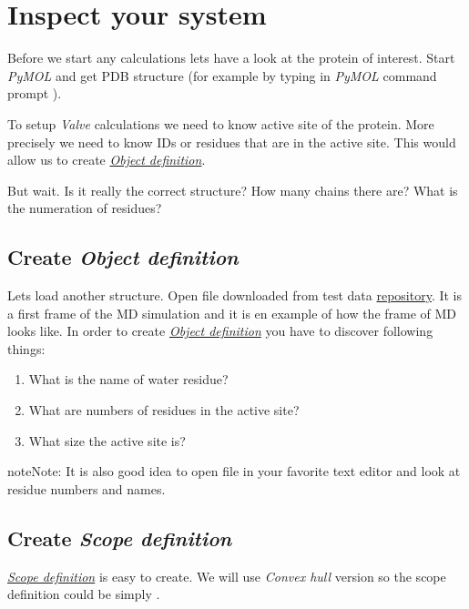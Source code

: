 \documentclass[a4paper,10pt,english]{sphinxmanual}
\begin{document}
\section{Inspect your system}
\label{valve/valve_tutorial:inspect-your-system}
Before we start any calculations lets have a look at the protein of interest. Start \emph{PyMOL} and get  PDB structure (for example by typing in \emph{PyMOL} command prompt ).

To setup \emph{Valve} calculations we need to know active site of the protein. More precisely we need to know IDs or residues that are in the active site. This would allow us to create {\hyperref[valve/valve_manual:object-definition]{\emph{Object definition}}}.

But wait. Is it really the correct structure? How many chains there are? What is the numeration of residues?


\subsection{Create \emph{Object definition}}
\label{valve/valve_tutorial:create-object-definition}
Lets load another structure. Open file  downloaded from test data \href{http://localhost:8001}{repository}. It is a first frame of the MD simulation and it is en example of how the frame of MD looks like. In order to create {\hyperref[valve/valve_manual:object-definition]{\emph{Object definition}}} you have to discover following things:
\begin{enumerate}
\item {} 
What is the name of water residue?

\item {} 
What are numbers of residues in the active site?

\item {} 
What size the active site is?

\end{enumerate}

\begin{notice}{note}{Note:}
It is also good idea to open  file in your favorite text editor and look at residue numbers and names.
\end{notice}


\subsection{Create \emph{Scope definition}}
\label{valve/valve_tutorial:create-scope-definition}
{\hyperref[valve/valve_manual:scope-definition]{\emph{Scope definition}}} is easy to create. We will use \emph{Convex hull} version so the scope definition could be simply .
\end{document}
